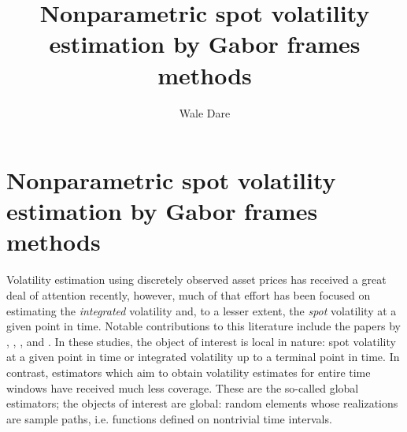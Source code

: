 
\usepackage[toc,page]{appendix}
\usepackage{epsf}
\usepackage{subfig}
\usepackage{graphicx}
\renewcommand{\i}{\mathrm{i}} 
\newcommand{\sumn}{\ensuremath{\sum_{k \in \nats}}\xspace}
\newcommand{\sumi}{\ensuremath{\sum_{k \in \ints}}\xspace}
\newcommand{\sumt}{\ensuremath{\sum_{(h,k) \in \Theta_n}}\xspace}
\newcommand{\sv}{\ensuremath{\sigma_t^2}\xspace}
\newcommand{\bsv}{\ensuremath{\bar{\sigma}^2}\xspace}
\newcommand{\svnt}{\ensuremath{\sigma^2}\xspace}
\newcommand{\svhk}{\ensuremath{\sigma^2_{h,k}}\xspace}
\newcommand{\vh}{\ensuremath{V_h(\phi)}\xspace}
\newcommand{\idp}{\ensuremath{\mu}\xspace}
\newcommand{\svn}{\ensuremath{\hat{\sigma}_{n}^2}\xspace}
\newcommand{\Svn}{\ensuremath{\hat{\Sigma}_n}\xspace}
\newcommand{\svnb}{\ensuremath{\hat{\sigma}_{n,b}^2}\xspace}
\newcommand{\svnN}{\ensuremath{\hat{\sigma}_{t}^2}\xspace}
\newcommand{\hs}{\ensuremath{\mcal{H}}\xspace}
\newcommand{\T}{\ensuremath{\tau}\xspace}
\newcommand{\chk}{\ensuremath{{c}_{h,k}}\xspace}
\newcommand{\cnhk}{\ensuremath{\hat{c}_{h,k}}\xspace}
\newcommand{\ivp}{\ensuremath{\sigma}\xspace}
\newcommand{\inner}[2]{\ensuremath{\langle{#1},{#2}\rangle}\xspace}
\newcommand{\ghk}{\ensuremath{g_{h,k}}\xspace}
\newcommand{\tghk}{\ensuremath{\tilde{g}_{h,k}}\xspace}
\newcommand{\btghki}{\ensuremath{\overline{\tilde{g}_{h,k}(t_i)}}\xspace}
\newcommand{\btghks}{\ensuremath{\overline{\tilde{g}_{h,k}(s)}}\xspace}
\newcommand{\tg}{\ensuremath{\tilde{g}}\xspace}
\newcommand{\hkints}{\ensuremath{h,k \in \ints}\xspace}
\newcommand{\mise}{integrated mean aquare error\xspace}
\newcommand{\isqb}{integrated square bias\xspace}
\newcommand{\ivar}{integated variance\xspace}
\author{Wale Dare}
\title {Nonparametric spot volatility estimation by Gabor frames methods}

\chapter {Nonparametric spot volatility estimation by Gabor frames methods}
Volatility estimation using discretely observed asset prices has received a great deal of attention recently, however,  much of that effort has been focused on 
estimating the \emph{integrated} volatility and, to a lesser extent, the \emph{spot} volatility at a given point in time. 
Notable contributions to this literature include  the papers by \cite{Foster1996}, \cite{Fan2008},   \cite{Florens1993}, and  \cite{BN2004}.
In these studies, the object of interest is local in nature: spot volatility at a given point in time or integrated volatility up to a terminal point in time. In contrast,  estimators which aim  to obtain  volatility estimates  for  entire time windows  have received much less coverage. These are the so-called global estimators; the objects of interest are global:   random elements whose realizations are sample paths, i.e. functions defined on  nontrivial time intervals.     


